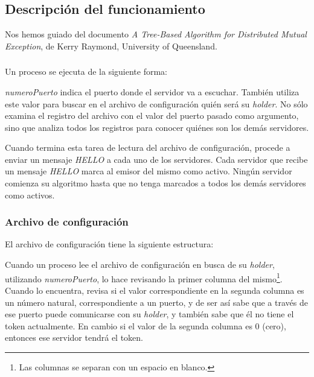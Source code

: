 \subsection{Descripción del funcionamiento}

Nos hemos guiado del documento \emph{A Tree-Based Algorithm for Distributed
Mutual Exception}, de Kerry Raymond, University of Queensland.

\subsubsection{}

Un proceso  se ejecuta de la siguiente forma:


\emph{numeroPuerto} indica el puerto donde el servidor va a escuchar. También
utiliza este valor para buscar en el archivo de configuración
 quién será su \emph{holder}. No sólo examina el
registro del archivo con el valor del puerto pasado como argumento, sino que
analiza todos los registros para conocer quiénes son los demás servidores.

Cuando termina esta tarea de lectura del archivo de configuración, procede a
enviar un mensaje \emph{HELLO} a cada uno de los servidores. Cada servidor que
recibe un mensaje \emph{HELLO} marca al emisor del mismo como activo. Ningún
servidor comienza su algoritmo hasta que no tenga marcados a todos los demás
servidores como activos.


\subsubsection{Archivo de configuración }

El archivo de configuración tiene la siguiente estructura:


Cuando un proceso  lee el archivo de configuración en busca de
su \emph{holder}, utilizando \emph{numeroPuerto}, lo hace revisando la primer
columna del mismo\footnote{Las columnas se separan con un espacio en blanco.}.
Cuando lo encuentra, revisa si el valor correspondiente en la segunda columna
es un número natural, correspondiente a un puerto, y de ser así sabe que a
través de ese puerto puede comunicarse con su \emph{holder}, y también sabe que
él no tiene el token actualmente. En cambio si el valor de la segunda columna es
0 (cero), entonces ese servidor tendrá el token.

